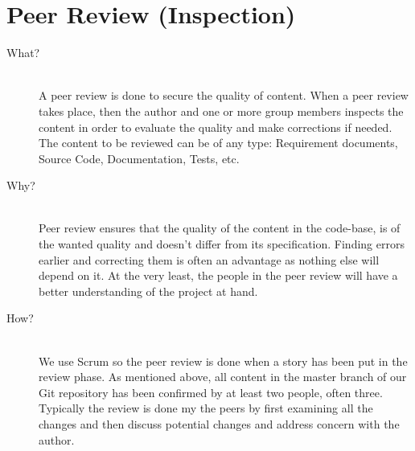 \section*{Peer Review (Inspection)}
\label{sec:peerreview}
\begin{description}
    \item[What?]\hfill\\
    A peer review is done to secure the quality of content. 
    When a peer review takes place, then the author and one or more group members inspects the content in order to evaluate the quality and make corrections if needed. 
    The content to be reviewed can be of any type: Requirement documents, Source Code, Documentation, Tests, etc.

    \item[Why?]\hfill\\ 
    Peer review ensures that the quality of the content in the code-base, is of the wanted quality and doesn't differ from its specification. 
    Finding errors earlier and correcting them is often an advantage as nothing else will depend on it. 
    At the very least, the people in the peer review will have a better understanding of the project at hand.

    \item[How?]\hfill\\
    We use Scrum so the peer review is done when a story has been put in the review phase. 
    As mentioned above, all content in the master branch of our Git repository has been confirmed by at least two people, often three. 
    Typically the review is done my the peers by first examining all the changes and then discuss potential changes and address concern with the author. 
\end{description}
